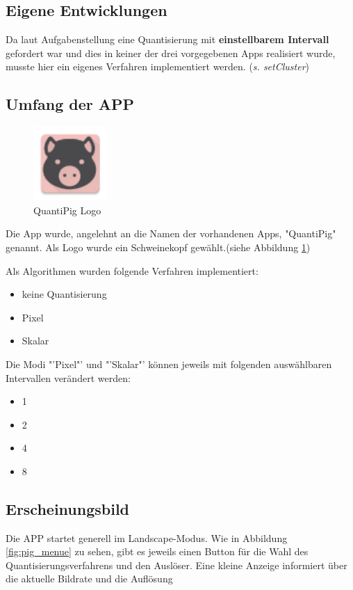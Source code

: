 \begin{description}
\subsection{Eigene Entwicklungen}

Da laut Aufgabenstellung eine Quantisierung mit \textbf{einstellbarem Intervall} gefordert war und dies in keiner der drei vorgegebenen Apps realisiert wurde, musste hier ein eigenes Verfahren implementiert werden. (\textit{s. setCluster})\\



\subsection{Umfang der APP}

\begin{figure}[h]
	\centering
		\includegraphics[width=0.25\textwidth]{img/ic_launcher.png}
	\caption[QuantiPig Logo]{QuantiPig Logo}
	\label{fig:pig_logo}
\end{figure}

Die App wurde, angelehnt an die Namen der vorhandenen Apps, "QuantiPig" genannt. Als Logo wurde ein Schweinekopf gewählt.(siehe Abbildung \ref{fig:pig_logo})

Als Algorithmen wurden folgende Verfahren implementiert:

\begin{itemize}
	\item keine Quantisierung
	\item Pixel  
	\item Skalar
\end{itemize}

Die Modi "'Pixel"' und "'Skalar"' können jeweils mit folgenden auswählbaren Intervallen verändert werden:
\begin{itemize}
	\item 1
	\item 2
	\item 4
	\item 8
\end{itemize}


\subsection{Erscheinungsbild}
Die APP startet generell im Landscape-Modus. Wie in Abbildung \ref{fig:pig_menue} zu sehen, gibt es jeweils einen Button für die Wahl des Quantisierungsverfahrens und den Auslöser. Eine kleine Anzeige informiert über die aktuelle Bildrate und die Auflösung


\end{description}
